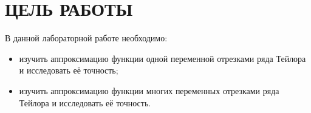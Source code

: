 \section{ЦЕЛЬ РАБОТЫ}

В данной лабораторной работе необходимо:

\begin{itemize}

\item
  изучить аппроксимацию функции одной переменной отрезками ряда Тейлора
  и исследовать её точность;
\item
  изучить аппроксимацию функции многих переменных отрезками ряда Тейлора
  и исследовать её точность.
  
\end{itemize}
